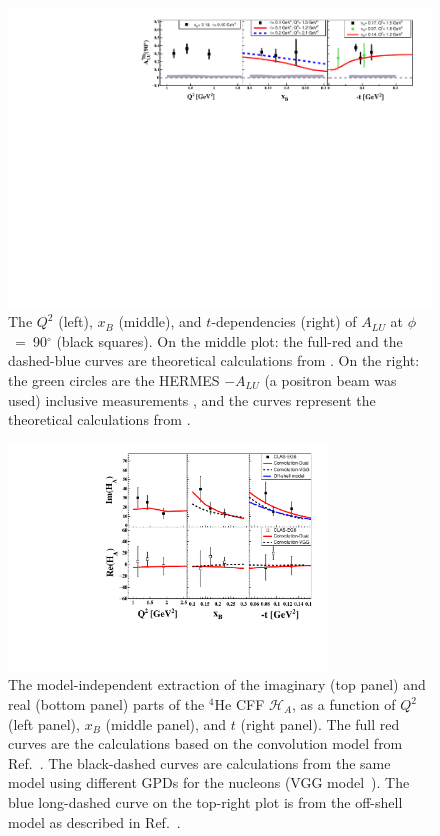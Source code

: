 \documentclass[twocolumn,nofootinbib,showpacs,prl,superscriptaddress,secnumarabic,amssymb,nobibnotes,aps,floatfix]{revtex4}
\begin{document}
\begin{figure}[tb]
\includegraphics[width=17cm]{figs/F_Coherent_ALU_phi_90.pdf}
\caption{The $Q^{2}$ (left), $x_{B}$ (middle), and $t$-dependencies (right) of
   $A_{LU}$ at $\phi$~=~90$^{\circ}$ (black squares). On the 
   middle plot: the full-red and the dashed-blue curves are theoretical 
   calculations from \cite{simonetta_2}. On the right: the green circles are 
   the HERMES $-A_{LU}$ (a positron beam was used) inclusive measurements 
   \cite{Airapetian}, and the curves represent the theoretical calculations 
   from \cite{simonetta_2}.}
\label{fig:alu90}
\end{figure}


\begin{figure}[tb]
\includegraphics[width=8.5cm]{figs/F_Coherent_CFF.pdf}
\caption{The model-independent extraction of the imaginary (top panel) and
real (bottom panel) parts of the $^4$He CFF $\mathcal{H}_A$, as a function of
$Q^{2}$ (left panel), $x_B$ (middle panel), and $t$ (right panel). The full red 
curves are the calculations based on the convolution model from Ref.~\cite{Vadim_priv}.
The black-dashed curves are calculations from the same 
model using different GPDs for the nucleons (VGG model~\cite{Guidal_priv}). The 
blue long-dashed curve on the top-right plot is from
the off-shell model as described in Ref.~\cite{GonzalezHernandez:2012jv}.}
\label{fig:CFF_HA}
\end{figure}
\end{document}
